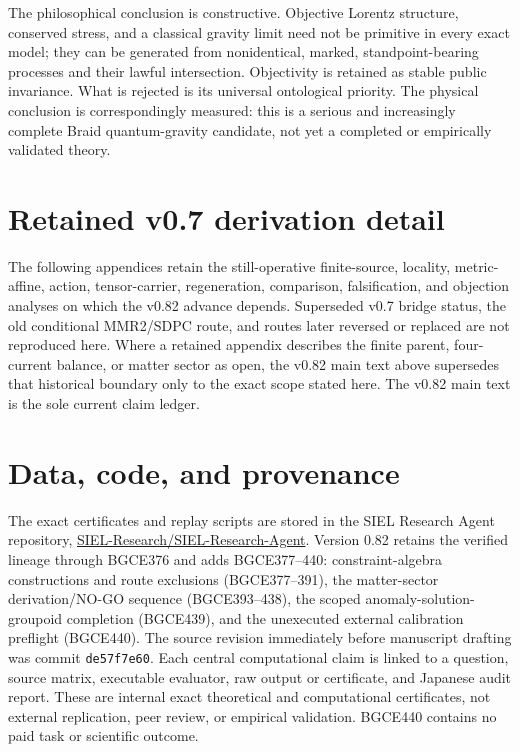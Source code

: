 \documentclass[11pt]{article}
\theoremstyle{definition}
\theoremstyle{remark}
\begin{document}
The philosophical conclusion is constructive. Objective Lorentz structure, conserved stress, and a classical gravity limit need not be primitive in every exact model; they can be generated from nonidentical, marked, standpoint-bearing processes and their lawful intersection. Objectivity is retained as stable public invariance. What is rejected is its universal ontological priority. The physical conclusion is correspondingly measured: this is a serious and increasingly complete Braid quantum-gravity candidate, not yet a completed or empirically validated theory.

\appendix
\section*{Retained v0.7 derivation detail}

The following appendices retain the still-operative finite-source, locality, metric-affine, action, tensor-carrier, regeneration, comparison, falsification, and objection analyses on which the v0.82 advance depends. Superseded v0.7 bridge status, the old conditional MMR2/SDPC route, and routes later reversed or replaced are not reproduced here. Where a retained appendix describes the finite parent, four-current balance, or matter sector as open, the v0.82 main text above supersedes that historical boundary only to the exact scope stated here. The v0.82 main text is the sole current claim ledger.



\section*{Data, code, and provenance}

The exact certificates and replay scripts are stored in the SIEL Research Agent repository,
\href{https://github.com/SIEL-Research/SIEL-Research-Agent}{SIEL-Research/SIEL-Research-Agent}. Version 0.82 retains the verified lineage through BGCE376 and adds BGCE377--440: constraint-algebra constructions and route exclusions (BGCE377--391), the matter-sector derivation/NO-GO sequence (BGCE393--438), the scoped anomaly-solution-groupoid completion (BGCE439), and the unexecuted external calibration preflight (BGCE440). The source revision immediately before manuscript drafting was commit \texttt{de57f7e60}. Each central computational claim is linked to a question, source matrix, executable evaluator, raw output or certificate, and Japanese audit report. These are internal exact theoretical and computational certificates, not external replication, peer review, or empirical validation. BGCE440 contains no paid task or scientific outcome.
\end{document}
